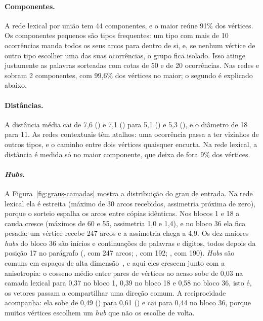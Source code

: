 \paragraph{Componentes.} A rede lexical por união tem 44 componentes, e o maior reúne 91\% dos
vértices. Os componentes pequenos são tipos frequentes: um tipo com mais de 10 ocorrências
manda todos os seus arcos para dentro de si, e, se nenhum vértice de outro tipo escolher uma
das suas ocorrências, o grupo fica isolado. Isso atinge justamente as palavras sorteadas com
cotas de 50 e de 20 ocorrências. Nas redes  e  sobram 2 componentes, com
99,6\% dos vértices no maior; o segundo é explicado abaixo.

\paragraph{Distâncias.} A distância média cai de 7,6 () e 7,1 () para 5,1
() e 5,3 (), e o diâmetro de 18 para 11. As redes contextuais têm atalhos:
uma ocorrência passa a ter vizinhos de outros tipos, e o caminho entre dois vértices quaisquer
encurta. Na rede lexical, a distância é medida só no maior componente, que deixa de fora 9\%
dos vértices.

\paragraph{\emph{Hubs}.} A Figura~\ref{fig:graus-camadas} mostra a distribuição do grau de
entrada. Na rede lexical ela é estreita (máximo de 30 arcos recebidos, assimetria próxima de
zero), porque o sorteio espalha os arcos entre cópias idênticas. Nos blocos 1 e 18 a cauda
cresce (máximos de 60 e 55, assimetria 1,0 e 1,4), e no bloco 36 ela fica pesada: um vértice
recebe 247 arcos e a assimetria chega a 4,9. Os dez maiores \emph{hubs} do bloco 36 são
inícios e continuações de palavras e dígitos, todos depois da posição 17 no parágrafo
(, com 247 arcos; , com 192; , com 190). \emph{Hubs} são
comuns em espaços de alta dimensão~\cite{radovanovic2010}, e aqui eles crescem junto com a
anisotropia: o cosseno médio entre pares de vértices ao acaso sobe de 0,03 na camada lexical
para 0,37 no bloco 1, 0,39 no bloco 18 e 0,58 no bloco 36, isto é, os vetores passam a
compartilhar uma direção comum. A reciprocidade acompanha: ela sobe de 0,49 () para
0,61 () e cai para 0,44 no bloco 36, porque muitos vértices escolhem um \emph{hub}
que não os escolhe de volta.

